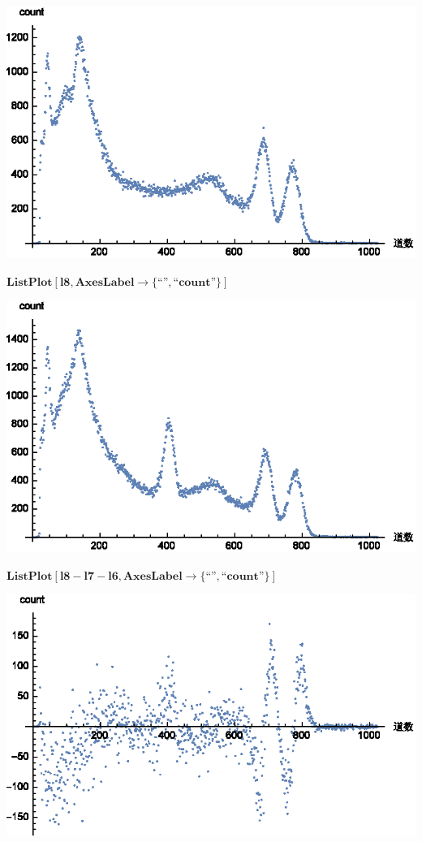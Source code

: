 \documentclass{article}
\newcommand{\unicode}[1]{{}}
\begin{document}
\includegraphics{data_gr6.eps}

\begin{doublespace}
\noindent\(\pmb{\text{ListPlot}[\text{l8},\text{AxesLabel}\to \{\text{{``}$\unicode{9053}\unicode{6570}${''}},\text{{``}count{''}}\}]}\)
\end{doublespace}

\includegraphics{data_gr7.eps}

\begin{doublespace}
\noindent\(\pmb{\text{ListPlot}[\text{l8}-\text{l7}-\text{l6},\text{AxesLabel}\to \{\text{{``}$\unicode{9053}\unicode{6570}${''}},\text{{``}count{''}}\}]}\)
\end{doublespace}

\includegraphics{data_gr8.eps}
\end{document}
